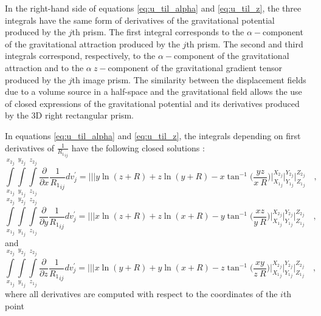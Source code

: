 \documentclass[journal abbreviation, manuscript]{copernicus}
\begin{document}
In the right-hand side of equations \ref{eq:u_til_alpha} and \ref{eq:u_til_z}, the three integrals have the same form of derivatives of the gravitational potential produced by the 
$j$th prism. 
The first integral corresponds to the $\alpha-$component of the gravitational attraction 
produced by the $j$th prism.
The second and third integrals correspond, respectively, to the $\alpha-$component of the gravitational attraction and to the $\alpha \:z-$component of the gravitational 
gradient tensor produced by the $j$th image prism. 
The similarity between the displacement fields due to a volume source in a half-space and the gravitational field allows the use of closed expressions of the gravitational potential and its derivatives produced by the 3D right rectangular prism.  

In equations  \ref{eq:u_til_alpha} and \ref{eq:u_til_z}, the integrals depending on 
first derivatives of ${\frac{1}{{R_1}_{ij}}}$ have the following closed solutions 
\citep{Nagyetal2000, Nagyetal2002}:
\begin{equation}
\int\limits_{{x_{1}}_{j}}^{{x_{2}}_{j}} \int\limits_{{y_{1}}_{j}}^{{y_{2}}_{j}} \int\limits_{{z_{1}}_{j}}^{{z_{2}}_{j}}
\frac{\partial }{\partial x} {\frac{1}{{R_1}_{ij}}} dv_{j}^{\prime} =
\Bigg|\Bigg|\Bigg| 
y \ln(z + R) + z \ln(y + R) -  x  \tan^{-1} \Bigg( \frac{yz}{x \: R} \Bigg) 
\Bigg|_{{X_1}_{j}}^{{X_2}_{j}} \Bigg|_{{Y_1}_{j}}^{{Y_2}_{j}} \Bigg|_{{Z_1}_{j}}^{{Z_2}_{j}} \quad ,
\label{dx1}
\end{equation}
\begin{equation}
\int\limits_{{x_{1}}_{j}}^{{x_{2}}_{j}} \int\limits_{{y_{1}}_{j}}^{{y_{2}}_{j}} \int\limits_{{z_{1}}_{j}}^{{z_{2}}_{j}}
\frac{\partial }{\partial y} {\frac{1}{{R_1}_{ij}}} dv_{j}^{\prime} =
\Bigg|\Bigg|\Bigg|
x \ln(z + R) + z \ln(x + R) -  y  \tan^{-1} \Bigg( \frac{xz}{y \: R} 
\Bigg)
\Bigg|_{{X_1}_{j}}^{{X_2}_{j}} \Bigg|_{{Y_1}_{j}}^{{Y_2}_{j}} \Bigg|_{{Z_1}_{j}}^{{Z_2}_{j}} \quad ,
\label{dy1}
\end{equation}
and
\begin{equation}
\int\limits_{{x_{1}}_{j}}^{{x_{2}}_{j}} \int\limits_{{y_{1}}_{j}}^{{y_{2}}_{j}} \int\limits_{{z_{1}}_{j}}^{{z_{2}}_{j}}
\frac{\partial }{\partial z} {\frac{1}{{R_1}_{ij}}} dv_{j}^{\prime} =
\Bigg|\Bigg|\Bigg|
x \ln(y + R) + y \ln(x + R) -  z  \tan^{-1} \Bigg( \frac{xy}{z \: R} \Bigg) 
\Bigg|_{{X_1}_{j}}^{{X_2}_{j}} \Bigg|_{{Y_1}_{j}}^{{Y_2}_{j}} \Bigg|_{{Z_1}_{j}}^{{Z_2}_{j}} \quad ,
\label{dz1}
\end{equation}
where all derivatives are computed with respect to the coordinates of the $i$th point 
\end{document}
